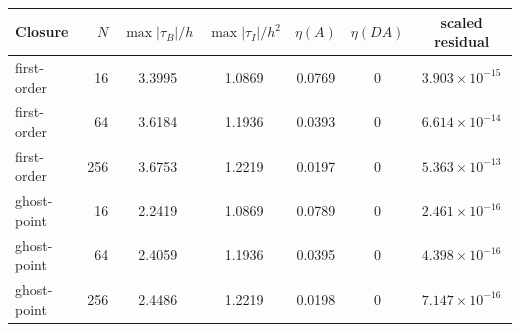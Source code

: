 \begin{tabular}{@{}lrccccc@{}}\toprule
Closure & $N$ & $\max|\tau_B|/h$ & $\max|\tau_I|/h^2$ & $\eta(A)$ & $\eta(DA)$ & scaled residual\\\midrule
first-order & 16 & 3.3995 & 1.0869 & 0.0769 & 0 & $3.903\times10^{-15}$\\
first-order & 64 & 3.6184 & 1.1936 & 0.0393 & 0 & $6.614\times10^{-14}$\\
first-order & 256 & 3.6753 & 1.2219 & 0.0197 & 0 & $5.363\times10^{-13}$\\
\midrule
ghost-point & 16 & 2.2419 & 1.0869 & 0.0789 & 0 & $2.461\times10^{-16}$\\
ghost-point & 64 & 2.4059 & 1.1936 & 0.0395 & 0 & $4.398\times10^{-16}$\\
ghost-point & 256 & 2.4486 & 1.2219 & 0.0198 & 0 & $7.147\times10^{-16}$\\
\bottomrule
\end{tabular}